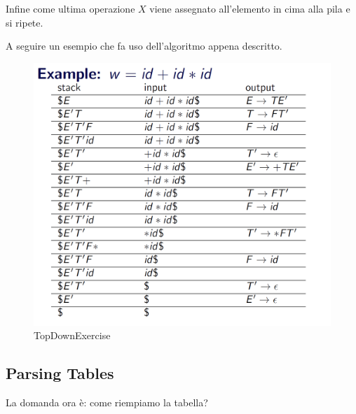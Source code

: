 \documentclass[class=book, crop=false, oneside, 12pt]{standalone}
\begin{document}
Infine come ultima operazione \(X\) viene assegnato all'elemento in cima alla pila e si ripete.

A seguire un esempio che fa uso dell'algoritmo appena descritto.

\begin{figure}[h]
    \centering
    \includegraphics[width=.7\textwidth,keepaspectratio]{TopDownExercise.png}
    \caption{TopDownExercise}
    \label{TopDownExercise}
\end{figure}

\subsection{Parsing Tables}
La domanda ora è: come riempiamo la tabella? %
\end{document}
